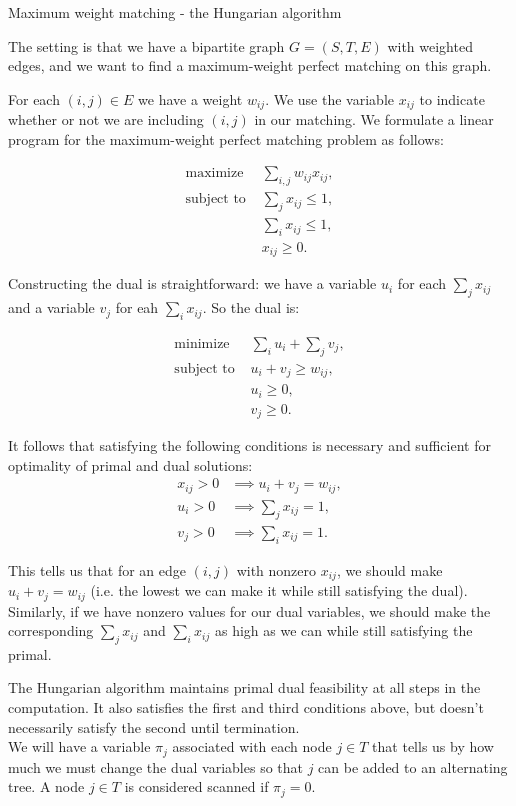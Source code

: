 \documentclass[11pt]{article}
\renewcommand{\'}{^{'}}
\begin{document}
\begin{section}{Maximum weight matching - the Hungarian algorithm}

The setting is that we have a bipartite graph $G = (S,T,E)$
with weighted edges, and we want to find a maximum-weight perfect matching on this graph.

For each $(i,j) \in E$ we have a weight $w_{ij}$. We use the variable $x_{ij}$ 
to indicate whether or not we are including $(i,j)$ in our matching.
We formulate a linear program for the maximum-weight perfect matching problem as follows:

\begin{align*}
	\text{maximize } &\sum_{i,j} w_{ij} x_{ij}, \\
	\text{subject to } &\sum_{j} x_{ij} \leq 1, \\
			   &\sum_{i} x_{ij} \leq 1, \\
			   &x_{ij} \geq 0.
\end{align*}

Constructing the dual is straightforward: we have a variable $u_i$ for each 
$\sum_{j} x_{ij}$ and a variable $v_j$ for eah $\sum_{i} x_{ij}$. So the dual is:

\begin{align*}
	\text{minimize } & \sum_{i} u_i + \sum_{j} v_j, \\
	\text{subject to } & u_i + v_j \geq w_{ij}, \\
			   & u_i \geq 0, \\
			   & v_j \geq 0.
\end{align*}

It follows that satisfying the following conditions is necessary and sufficient for 
optimality of primal and dual solutions:
\begin{align}
	x_{ij} > 0 &\implies u_i + v_j = w_{ij},\\
	u_i > 0 &\implies \sum_j x_{ij} = 1,\\
	v_j > 0 &\implies \sum_i x_{ij} = 1.
\end{align}

This tells us that for an edge $(i,j)$ with nonzero $x_{ij}$, we should make 
$u_i + v_j = w_{ij}$ (i.e. the lowest we can make it while still satisfying the dual). 
Similarly, if we have nonzero values for our dual variables, we should make the 
corresponding $\sum_j x_{ij}$ and $\sum_i x_{ij}$ as high as we can while still satisfying 
the primal.

The Hungarian algorithm maintains primal dual feasibility at all steps in the computation.
It also satisfies the first and third conditions above, but doesn't necessarily satisfy the 
second until termination.\\
We will have a variable $\pi_j$ associated with each node $j\in T$ that tells us by how 
much we must change the dual variables so that $j$ can be added to an alternating tree.
A node $j\in T$ is considered scanned if $\pi_j = 0$.


\end{section}
\end{document}
